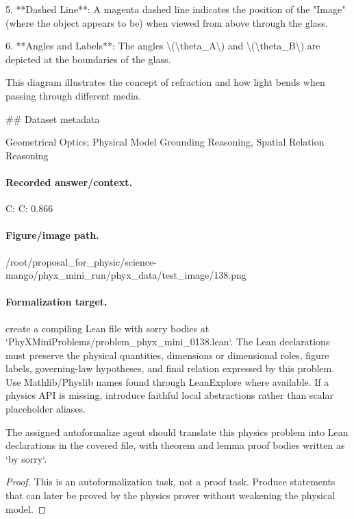 5. **Dashed Line**: A magenta dashed line indicates the position of the "Image" (where the object appears to be) when viewed from above through the glass.

6. **Angles and Labels**: The angles \textbackslash{}(\textbackslash{}theta\_A\textbackslash{}) and \textbackslash{}(\textbackslash{}theta\_B\textbackslash{}) are depicted at the boundaries of the glass.

This diagram illustrates the concept of refraction and how light bends when passing through different media.

\#\# Dataset metadata

Geometrical Optics; Physical Model Grounding Reasoning, Spatial Relation Reasoning

\paragraph{Recorded answer/context.}
C: C: 0.866

\paragraph{Figure/image path.}
/root/proposal\_for\_physic/science-mango/phyx\_mini\_run/phyx\_data/test\_image/138.png

\paragraph{Formalization target.}
create a compiling Lean file with sorry bodies at `PhyXMiniProblems/problem\_phyx\_mini\_0138.lean`. The Lean declarations must preserve the physical quantities, dimensions or dimensional roles, figure labels, governing-law hypotheses, and final relation expressed by this problem.
Use Mathlib/Physlib names found through LeanExplore where available. If a physics API is missing, introduce faithful local abstractions rather than scalar placeholder aliases.

\begin{theorem}
\label{thm:physics:phyx_mini_0138:target}
The assigned autoformalize agent should translate this physics problem into Lean declarations in the covered file, with theorem and lemma proof bodies written as `by sorry`.
\end{theorem}
\begin{proof}
This is an autoformalization task, not a proof task. Produce statements that can later be proved by the physics prover without weakening the physical model.
\end{proof}

